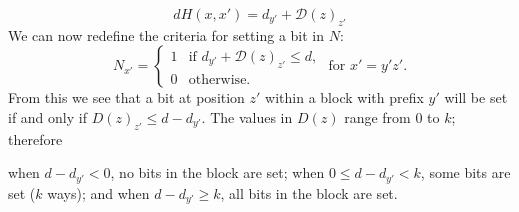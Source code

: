 \documentclass{acm_proc_article-sp}
\begin{document}
\begin{enumerate}
			\begin{equation}
				dH(x,x') = d_{y'} + \mathcal{D}(z)_{z'}
				\end{equation}
			We can now redefine the criteria for setting a bit in $N$:
			\begin{equation*}
				N_{x'} = \left\{
				\begin{array}{rl}
					1 & \text{if } d_{y'} + \mathcal{D}(z)_{z'} \leq d,\\
					0 & \text{otherwise.}%
				\end{array} \right.
				\text{ for }x' = y'z'.
				\end{equation*}
			From this we see that a bit at position $z'$ within a block with prefix $y'$ will be set if and only if $D(z)_{z'} \leq d-d_{y'}$. The values in $D(z)$ range from 0 to $k$; therefore\newline

				{\small
					\hspace*{5pt} when $d-d_{y'} < 0$, 		\hspace*{24pt}no bits in the block are set;\newline
					\hspace*{5pt} when $0 \leq d-d_{y'} < k$,	\hspace*{6.5pt}some bits are set ($k$ ways); and\newline
					\hspace*{5pt} when $d-d_{y'} \geq k$, 		\hspace*{24pt}all bits in the block are set. \newline}
			

\end{enumerate}
\end{document}
